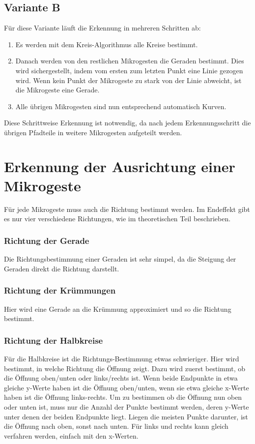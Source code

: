 \subsection{Variante B}
Für diese Variante läuft die Erkennung in mehreren Schritten ab:
\begin{enumerate}
\item Es werden mit dem Kreis-Algorithmus alle Kreise bestimmt.
\item Danach werden von den restlichen Mikrogesten die Geraden bestimmt. Dies wird sichergestellt, indem vom ersten zum letzten Punkt eine Linie gezogen wird. Wenn kein Punkt der Mikrogeste zu stark von der Linie abweicht, ist die Mikrogeste eine Gerade.
\item Alle übrigen Mikrogesten sind nun entsprechend automatisch Kurven.
\end{enumerate}

Diese Schrittweise Erkennung ist notwendig, da nach jedem Erkennungsschritt die übrigen Pfadteile in weitere Mikrogesten aufgeteilt werden.


\section{Erkennung der Ausrichtung einer Mikrogeste}
Für jede Mikrogeste muss auch die Richtung bestimmt werden. Im Endeffekt gibt es nur vier verschiedene Richtungen, wie im theoretischen Teil beschrieben. 
\subsubsection{Richtung der Gerade}
Die Richtungsbestimmung einer Geraden ist sehr simpel, da die Steigung der Geraden direkt die Richtung darstellt.
\subsubsection{Richtung der Krümmungen}
Hier wird eine Gerade an die Krümmung approximiert und so die Richtung bestimmt.
\subsubsection{Richtung der Halbkreise}
Für die Halbkreise ist die Richtungs-Bestimmung etwas schwieriger. Hier wird bestimmt, in welche Richtung die Öffnung zeigt.
Dazu wird zuerst bestimmt, ob die Öffnung oben/unten oder links/rechts ist. Wenn beide Endpunkte in etwa gleiche y-Werte haben ist die Öffnung oben/unten, wenn sie etwa gleiche x-Werte haben ist die Öffnung links-rechts.
Um zu bestimmen ob die Öffnung nun oben oder unten ist, muss nur die Anzahl der Punkte bestimmt werden, deren y-Werte unter denen der beiden Endpunkte liegt. Liegen die meisten Punkte darunter, ist die Öffnung nach oben, sonst nach unten. Für links und rechts kann gleich verfahren werden, einfach mit den x-Werten.

